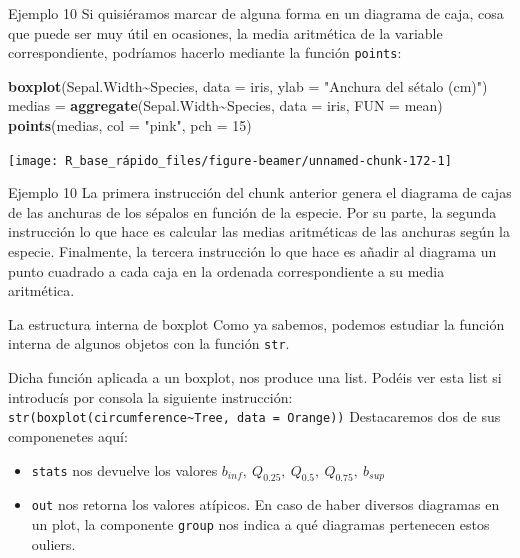 \documentclass[
  ignorenonframetext,
  aspectratio=169]{beamer}
\newenvironment{Shaded}{\begin{snugshade}}{\end{snugshade}}
\newcommand{\AttributeTok}[1]{\textcolor[rgb]{0.13,0.29,0.53}{#1}}
\newcommand{\DecValTok}[1]{\textcolor[rgb]{0.00,0.00,0.81}{#1}}
\newcommand{\FunctionTok}[1]{\textcolor[rgb]{0.13,0.29,0.53}{\textbf{#1}}}
\newcommand{\NormalTok}[1]{#1}
\newcommand{\OtherTok}[1]{\textcolor[rgb]{0.56,0.35,0.01}{#1}}
\newcommand{\SpecialCharTok}[1]{\textcolor[rgb]{0.81,0.36,0.00}{\textbf{#1}}}
\newcommand{\StringTok}[1]{\textcolor[rgb]{0.31,0.60,0.02}{#1}}
\providecommand{\tightlist}{%
  \setlength{\itemsep}{0pt}\setlength{\parskip}{0pt}}
\begin{document}
\begin{frame}[fragile]{Ejemplo 10}
\label{ejemplo-10-1}
Si quisiéramos marcar de alguna forma en un diagrama de caja, cosa que
puede ser muy útil en ocasiones, la media aritmética de la variable
correspondiente, podríamos hacerlo mediante la función \texttt{points}:

\begin{Shaded}
\begin{Highlighting}[]
\FunctionTok{boxplot}\NormalTok{(Sepal.Width}\SpecialCharTok{\textasciitilde{}}\NormalTok{Species, }\AttributeTok{data =}\NormalTok{ iris, }\AttributeTok{ylab =} \StringTok{"Anchura del sétalo (cm)"}\NormalTok{)}
\NormalTok{medias }\OtherTok{=} \FunctionTok{aggregate}\NormalTok{(Sepal.Width}\SpecialCharTok{\textasciitilde{}}\NormalTok{Species, }\AttributeTok{data =}\NormalTok{ iris, }\AttributeTok{FUN =}\NormalTok{ mean)}
\FunctionTok{points}\NormalTok{(medias, }\AttributeTok{col =} \StringTok{"pink"}\NormalTok{, }\AttributeTok{pch =} \DecValTok{15}\NormalTok{)}
\end{Highlighting}
\end{Shaded}

\begin{center}\texttt{[image: R\_base\_rápido\_files/figure-beamer/unnamed-chunk-172-1]} \end{center}
\end{frame}

\begin{frame}{Ejemplo 10}
\label{ejemplo-10-2}
La primera instrucción del chunk anterior genera el diagrama de cajas de
las anchuras de los sépalos en función de la especie. Por su parte, la
segunda instrucción lo que hace es calcular las medias aritméticas de
las anchuras según la especie. Finalmente, la tercera instrucción lo que
hace es añadir al diagrama un punto cuadrado a cada caja en la ordenada
correspondiente a su media aritmética.
\end{frame}

\begin{frame}[fragile]{La estructura interna de boxplot}
\label{la-estructura-interna-de-boxplot}
Como ya sabemos, podemos estudiar la función interna de algunos objetos
con la función \texttt{str}.

Dicha función aplicada a un boxplot, nos produce una list. Podéis ver
esta list si introducís por consola la siguiente instrucción:
\texttt{str(boxplot(circumference\textasciitilde{}Tree,\ data\ =\ Orange))}
Destacaremos dos de sus componenetes aquí:

\begin{itemize}
\tightlist
\item
  \texttt{stats} nos devuelve los valores
  \(b_{inf},\ Q_{0.25},\ Q_{0.5},\ Q_{0.75},\ b_{sup}\)
\item
  \texttt{out} nos retorna los valores atípicos. En caso de haber
  diversos diagramas en un plot, la componente \texttt{group} nos indica
  a qué diagramas pertenecen estos ouliers.
\end{itemize}
\end{frame}
\end{document}
